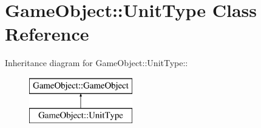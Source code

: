 \hypertarget{classGameObject_1_1UnitType}{
\section{GameObject::UnitType Class Reference}
\label{classGameObject_1_1UnitType}
}
Inheritance diagram for GameObject::UnitType::\begin{figure}[H]
\begin{center}
\leavevmode
\includegraphics[height=2cm]{classGameObject_1_1UnitType}
\end{center}
\end{figure}
